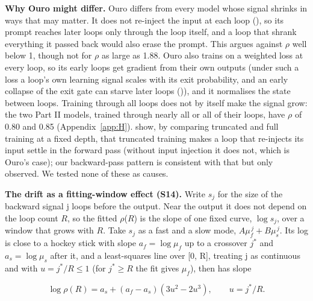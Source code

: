 \documentclass[10pt]{article}
\begin{document}
\textbf{Why Ouro might differ.} Ouro differs from every model whose signal shrinks in ways that may matter. It does not re-inject the input at each loop (\citealp[Eq.~1]{zhu2025ouro}), so its prompt reaches later loops only through the loop itself, and a loop that shrank everything it passed back would also erase the prompt. This argues against $\rho$ well below 1, though not for $\rho$ as large as 1.88. Ouro also trains on a weighted loss at every loop, so its early loops get gradient from their own outputs (under such a loss a loop's own learning signal scales with its exit probability, and an early collapse of the exit gate can starve later loops (\citealp{marchenko2026})), and it normalises the state between loops. Training through all loops does not by itself make the signal grow: the two Part II models, trained through nearly all or all of their loops, have $\rho$ of 0.80 and 0.85 (Appendix~\ref{app:H}). \citet[App.~C.3]{huang2026partii} show, by comparing truncated and full training at a fixed depth, that truncated training makes a loop that re-injects its input settle in the forward pass (without input injection it does not, which is Ouro's case); our backward-pass pattern is consistent with that but only observed. We tested none of these as causes.

\textbf{The drift as a fitting-window effect (S14).} Write $s_j$ for the size of the backward signal j loops before the output. Near the output it does not depend on the loop count $R$, so the fitted $\rho$($R$) is the slope of one fixed curve, $\log s_j$, over a window that grows with $R$. Take $s_j$ as a fast and a slow mode, $A\mu_f^{\,j} + B\mu_s^{\,j}$. Its log is close to a hockey stick with slope $a_f = \log\mu_f$ up to a crossover $j^*$ and $a_s = \log\mu_s$ after it, and a least-squares line over [0, R], treating j as continuous and with $u = j^*/R \leq 1$ (for $j^* \geq R$ the fit gives $\mu_f$), then has slope

\begin{equation*}\log\rho(R) = a_s + (a_f - a_s)(3u^2 - 2u^3),\qquad u = j^*/R.\end{equation*}
\end{document}
